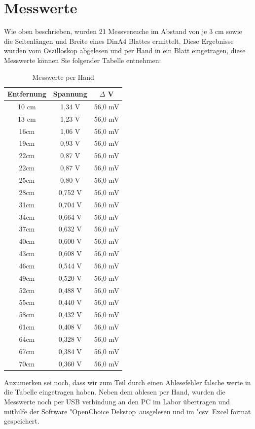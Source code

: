 \documentclass[TGAI_Laborbericht.tex]{subfiles}
\begin{document}
\section{Messwerte}
\label{chap:VERSUCH_1_MESSWERTE}
\begin{flushleft}
Wie oben beschrieben, wurden 21 Messversuche im Abstand von je 3 cm sowie die
Seitenlängen und Breite eines DinA4 Blattes ermittelt. Diese Ergebnisse wurden vom
Oszilloskop abgelesen und per Hand in ein Blatt eingetragen, diese Messwerte können Sie
folgender Tabelle entnehmen:
\begin{table}[H]
\begin{tabular}{|c|c|c|}
Entfernung & Spannung & $\Delta$ V \\ 
\hline 
10 cm & 1,34 V & 56,0 mV \\ 
\hline 
13 cm & 1,23 V & 56,0 mV \\ 
\hline 
16cm & 1,06 V & 56,0 mV \\ 
\hline 
19cm & 0,93 V & 56,0 mV \\
\hline 
22cm & 0,87 V & 56,0 mV \\
\hline 
22cm & 0,87 V & 56,0 mV \\
\hline 
25cm & 0,80 V & 56,0 mV \\ 
\hline 
28cm & 0,752 V & 56,0 mV \\
\hline
31cm & 0,704 V & 56,0 mV \\
\hline
34cm & 0,664 V & 56,0 mV \\
\hline
37cm & 0,632 V & 56,0 mV \\
\hline
40cm & 0,600 V & 56,0 mV \\
\hline
43cm & 0,608 V & 56,0 mV \\
\hline
46cm & 0,544 V & 56,0 mV \\
\hline
49cm & 0,520 V & 56,0 mV \\
\hline
52cm & 0,488 V & 56,0 mV \\
\hline
55cm & 0,440 V & 56,0 mV \\
\hline
58cm & 0,432 V & 56,0 mV \\
\hline
61cm & 0,408 V & 56,0 mV \\
\hline
64cm & 0,328 V & 56,0 mV \\
\hline
67cm & 0,384 V & 56,0 mV \\
\hline
70cm & 0,360 V & 56,0 mV \\
\hline
\end{tabular}
\label{Messwerte per Hand}
\caption{Messwerte per Hand} 
\end{table}
	
Anzumerken sei noch, dass wir zum Teil durch einen Ablesefehler falsche werte in die Tabelle eingetragen haben.
Neben dem ablesen per Hand, wurden die Messwerte noch per USB verbindung an den PC im Labor übertragen und mithilfe der Software "OpenChoice Dekstop\dq ~ausgelesen und im "csv\dq ~Excel format gespeichert. 
\end{flushleft}
\end{document}
